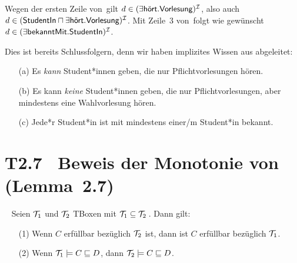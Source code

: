 \documentclass[fontsize=11pt, twoside=false, numbers=autoenddot]{scrbook}
\begin{document}
\begin{enumerate}
    Wegen der ersten Zeile von~\Tmc gilt
    $d \in (\exists\textsf{hört}.\textsf{Vorlesung})^\mathcal{I}$,
    also auch $d \in (\textsf{StudentIn} \sqcap \exists\textsf{hört}.\textsf{Vorlesung})^\mathcal{I}$.
    Mit Zeile~3 von~\Tmc folgt wie gewünscht $d \in (\exists\textsf{bekanntMit}.\textsf{StudentIn})^\mathcal{I}$.    
\end{enumerate}
%
Dies ist bereits Schlussfolgern, denn wir haben implizites Wissen aus \Tmc abgeleitet:
%
\begin{enumerate}
  \item[(a)]
    Es \emph{kann} Student*innen geben, die nur Pflichtvorlesungen hören.
  \item[(b)]
    Es kann \emph{keine} Student*innen geben, die nur Pflichtvorlesungen,
    aber mindestens eine Wahlvorlesung hören.
  \item[(c)]
    Jede*r Student*in ist mit mindestens einer/m Student*in bekannt.
\end{enumerate}

\section*{T2.7~ Beweis der Monotonie von {\boldmath \ALC} (Lemma~2.7)}

~
Seien $\mathcal{T}_1$ und $\mathcal{T}_2$ TBoxen mit $\mathcal{T}_1 \subseteq \mathcal{T}_2$\,. Dann gilt:
%
\begin{enumerate}
  \item[(1)]
    Wenn $C$ erfüllbar bezüglich $\mathcal{T}_2$ ist, dann ist $C$ erfüllbar bezüglich $\mathcal{T}_1$.
  \item[(2)]
    Wenn $\mathcal{T}_1 \models C \sqsubseteq D$, dann $\mathcal{T}_2 \models C \sqsubseteq D$.
\end{enumerate}
\end{document}
